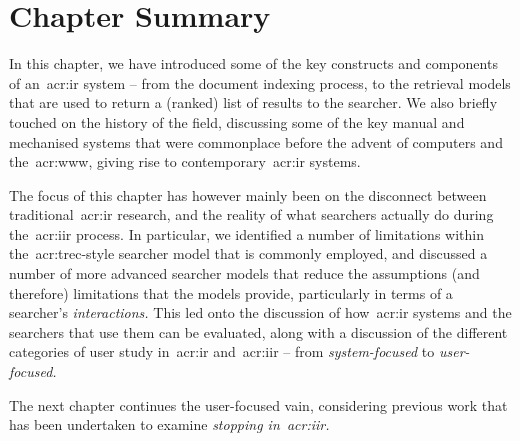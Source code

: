 \section{Chapter Summary}
In this chapter, we have introduced some of the key constructs and components of an~\gls{acr:ir} system -- from the document indexing process, to the retrieval models that are used to return a (ranked) list of results to the searcher. We also briefly touched on the history of the field, discussing some of the key manual and mechanised systems that were commonplace before the advent of computers and the~\gls{acr:www}, giving rise to contemporary~\gls{acr:ir} systems.

The focus of this chapter has however mainly been on the disconnect between traditional~\gls{acr:ir} research, and the reality of what searchers actually do during the~\gls{acr:iir} process. In particular, we identified a number of limitations within the~\gls{acr:trec}-style searcher model that is commonly employed, and discussed a number of more advanced searcher models that reduce the assumptions (and therefore) limitations that the models provide, particularly in terms of a searcher's \emph{interactions.} This led onto the discussion of how~\gls{acr:ir} systems and the searchers that use them can be evaluated, along with a discussion of the different categories of user study in~\gls{acr:ir} and~\gls{acr:iir} -- from \emph{system-focused} to \emph{user-focused.}

The next chapter continues the user-focused vain, considering previous work that has been undertaken to examine \emph{stopping in~\gls{acr:iir}.}